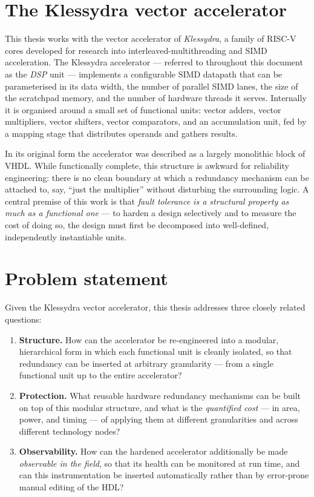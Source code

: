 \section{The Klessydra vector accelerator}

This thesis works with the vector accelerator of \emph{Klessydra}, a family of
RISC-V cores developed for research into interleaved-multithreading and
SIMD acceleration. The Klessydra accelerator --- referred to throughout this
document as the \emph{DSP} unit --- implements a configurable SIMD datapath that
can be parameterised in its data width, the number of parallel SIMD lanes, the
size of the scratchpad memory, and the number of hardware threads it serves.
Internally it is organised around a small set of functional units: vector
adders, vector multipliers, vector shifters, vector comparators, and an
accumulation unit, fed by a mapping stage that distributes operands and gathers
results.

In its original form the accelerator was described as a largely monolithic block
of VHDL. While functionally complete, this structure is awkward for reliability
engineering: there is no clean boundary at which a redundancy mechanism can be
attached to, say, ``just the multiplier'' without disturbing the surrounding
logic. A central premise of this work is that \emph{fault tolerance is a
structural property as much as a functional one} --- to harden a design
selectively and to measure the cost of doing so, the design must first be
decomposed into well-defined, independently instantiable units.

\section{Problem statement}

Given the Klessydra vector accelerator, this thesis addresses three closely
related questions:

\begin{enumerate}
  \item \textbf{Structure.} How can the accelerator be re-engineered into a
        modular, hierarchical form in which each functional unit is cleanly
        isolated, so that redundancy can be inserted at arbitrary granularity ---
        from a single functional unit up to the entire accelerator?
  \item \textbf{Protection.} What reusable hardware redundancy mechanisms can be
        built on top of this modular structure, and what is the \emph{quantified
        cost} --- in area, power, and timing --- of applying them at different
        granularities and across different technology nodes?
  \item \textbf{Observability.} How can the hardened accelerator additionally be
        made \emph{observable in the field}, so that its health can be monitored
        at run time, and can this instrumentation be inserted automatically
        rather than by error-prone manual editing of the HDL?
\end{enumerate}

